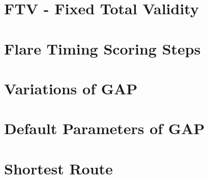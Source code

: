 \documentclass{article}
\begin{document}
\newpage
\section{FTV - Fixed Total Validity}


\newpage
\appendix
\appendixpage
\addappheadtotoc

\section{Flare Timing Scoring Steps}


\newpage
\section{Variations of GAP}


\newpage
\section{Default Parameters of GAP}


\newpage
\section{Shortest Route}

\end{document}
